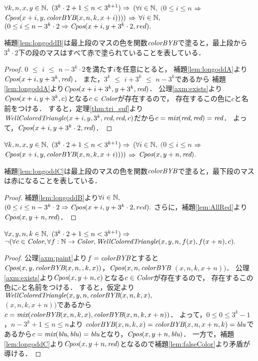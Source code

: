 \begin{lem}[\LongOddB] \label{lem:longoddB}
  $\forall k,n,x,y \in \mathbb{N},$
  $(3^k \cdot 2 + 1 \leq n < 3^{k+1}) \Rightarrow$
  $(\forall i \in \mathbb{N},$ $(0 \leq i \leq n$ $\Rightarrow$ $\textit{Cpos}(x+i,y,\textit{colorBYB}(x,n,k,x+i))))$ $\Rightarrow$ 
  $\forall i \in \mathbb{N},$ $(0 \leq i \leq n-3^k\cdot2 \Rightarrow \textit{Cpos}(x+i,y+3^k\cdot2,red).$
\end{lem}
補題\ref{lem:longoddB}は最上段のマスの色を関数$\textit{colorBYB}$で塗ると，最上段から$3^k\cdot2$下の段のマスはすべて赤で塗られていることを表している．
\begin{proof}
  $0$ $\leq$ $i$ $\leq$ $n - 3^k \cdot 2$を満たす$i$を任意にとると，
  補題\ref{lem:longoddA}より$\textit{Cpos}(x+i,y+3^k,\textit{red})$．
  また，$3^k$ $\leq$ $i+3^k$ $\leq$ $n - 3^k$であるから
  補題\ref{lem:longoddA}より$\textit{Cpos}(x+i+3^k,y+3^k,\textit{red})$．
  公理\ref{axm:exists}より$\textit{Cpos}(x+i,y+3^k,c)$となる$c\in\textit{Color}$が存在するので，
  存在するこの色に$c$と名前をつける．
  すると，定理\ref{thm:tri_suf}より$\textit{WellColoredTriangle}(x+i,y,3^k,\textit{red},\textit{red},c)$だから$c=\textit{mix}(\textit{red},\textit{red})=\textit{red}$．
  よって，$\textit{Cpos}(x+i,y+3^k\cdot2,\textit{red})$．
\end{proof}

\begin{lem}[\LongOddC] \label{lem:longoddC}
  $\forall k,n,x,y \in \mathbb{N},$
  $(3^k\cdot2 + 1 \leq n < 3^{k+1}) \Rightarrow$
  $(\forall i \in \mathbb{N},$ $(0 \leq i \leq n$ $\Rightarrow$ $\textit{Cpos}(x+i,y,\textit{colorBYB}(x,n,k,x+i))))$ $\Rightarrow$ 
  $\textit{Cpos}(x,y+n,\textit{red}).$
\end{lem}
補題\ref{lem:longoddC}は最上段のマスの色を関数$\textit{colorBYB}$で塗ると，最下段のマスは赤になることを表している．
\begin{proof}
  補題\ref{lem:longoddB}より$\forall i \in \mathbb{N},$ $(0 \leq i \leq n-3^k\cdot2 \Rightarrow \textit{Cpos}(x+i,y+3^k\cdot2,red).$
  さらに，補題\ref{lem:AllRed}より$\textit{Cpos}(x,y+n,\textit{red})$．
\end{proof}
\begin{lem}[\LongOdd] \label{lem:longodd}
  $\forall x,y,n,k \in \mathbb{N},$
  $(3^k\cdot2 + 1 \leq n < 3^{k+1}) \Rightarrow$
  $\lnot(\forall c \in \textit{Color}, \forall f:\mathbb{N} \to \textit{Color}, \textit{WellColoredTriangle}(x,y,n,f(x),f(x+n), c).$
\end{lem}
\begin{proof}
  公理\ref{axm:paint}より$f=\textit{colorBYB}$とすると
  $\textit{Cpos}(x,y,\textit{colorBYB}(x,n,,k,x))$，$\textit{Cpos}(x,n,\textit{colorBYB}$ $(x,n,k,x+n))$．
  公理\ref{axm:exists}より$\textit{Cpos}(x,y+n,c)$となる$c\in\textit{Color}$が存在するので，
  存在するこの色に$c$と名前をつける．
  すると，仮定より$\textit{WellColoredTriangle}(x,y,n,\textit{colorBYB}(x,n,k,x),$ \\
  $(x,n,k,x+n))$であるから$c=\textit{mix}(\textit{colorBYB}(x,n,k,x),\textit{colorBYB}(x,n,k,x+n))$．
  よって，$0 \leq 0 \leq 3^k-1$，$n-3^k+1 \leq n \leq n$より
  $\textit{colorBYB}(x,n,k,x)=\textit{colorBYB}(x,n,x+n,k)=\textit{blu}$であるから$c=\textit{mix}(\textit{blu},\textit{blu})=\textit{blu}$となり，$\textit{Cpos}(x,y+n,\textit{blu})$．
  一方で，補題\ref{lem:longoddC}より$\textit{Cpos}(x,y+n,\textit{red})$となるので補題\ref{lem:falseColor}より矛盾が導ける．
\end{proof}

